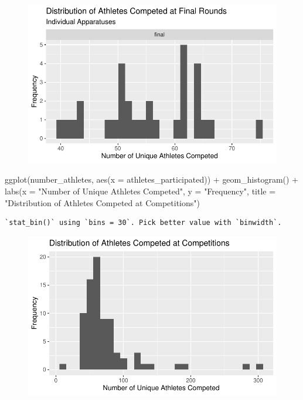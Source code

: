 \documentclass[
  letterpaper,
  DIV=11,
  numbers=noendperiod]{scrartcl}
\newenvironment{Shaded}{\begin{snugshade}}{\end{snugshade}}
\newcommand{\AttributeTok}[1]{\textcolor[rgb]{0.40,0.45,0.13}{#1}}
\newcommand{\FunctionTok}[1]{\textcolor[rgb]{0.28,0.35,0.67}{#1}}
\newcommand{\NormalTok}[1]{\textcolor[rgb]{0.00,0.23,0.31}{#1}}
\newcommand{\SpecialCharTok}[1]{\textcolor[rgb]{0.37,0.37,0.37}{#1}}
\newcommand{\StringTok}[1]{\textcolor[rgb]{0.13,0.47,0.30}{#1}}
\begin{document}
\begin{figure}[H]

{\centering \includegraphics{Main_files/figure-pdf/unnamed-chunk-6-3.pdf}

}

\end{figure}

\begin{Shaded}
\begin{Highlighting}[]
\FunctionTok{ggplot}\NormalTok{(number\_athletes, }\FunctionTok{aes}\NormalTok{(}\AttributeTok{x =}\NormalTok{ athletes\_participated)) }\SpecialCharTok{+}
  \FunctionTok{geom\_histogram}\NormalTok{() }\SpecialCharTok{+}
  \FunctionTok{labs}\NormalTok{(}\AttributeTok{x =} \StringTok{"Number of Unique Athletes Competed"}\NormalTok{,}
       \AttributeTok{y =} \StringTok{"Frequency"}\NormalTok{,}
       \AttributeTok{title =} \StringTok{"Distribution of Athletes Competed at Competitions"}\NormalTok{)}
\end{Highlighting}
\end{Shaded}

\begin{verbatim}
`stat_bin()` using `bins = 30`. Pick better value with `binwidth`.
\end{verbatim}

\begin{figure}[H]

{\centering \includegraphics{Main_files/figure-pdf/unnamed-chunk-6-4.pdf}

}

\end{figure}
\end{document}
